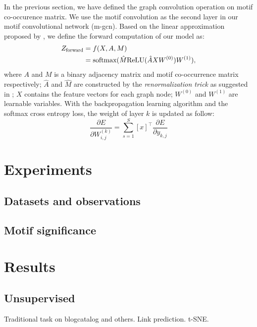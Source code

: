 \documentclass{article}
\theoremstyle{definition}
\begin{document}
In the previous section, we have defined the graph convolution
operation on motif co-occurence matrix. We use the motif convolution
as the second layer in our motif convolutional network (m-gcn). Based on the 
linear approximation proposed by \citeauthor{gcn}, we define the forward
computation of our model as:
\begin{equation} \label{eq:2}
    \begin{aligned}
    Z_{\scalebox{0.75}{forward}} &= f(X,A,M) \\
    &= \mbox{softmax}(\hat{M} \mbox{ReLU}(\hat{A}XW^{(0)})W^{(1)}),
    \end{aligned}
\end{equation}
where $A$ and $M$ is a binary adjacency matrix and motif co-occurrence
matrix respectively; $\hat{A}$ and $\hat{M}$ are constructed by the
\emph{renormalization trick} as suggested in \cite{gcn}; $X$ contains
the feature vectors for each graph node; $W^{(0)}$ and $W^{(1)}$ are
learnable variables. With the backpropagation learning algorithm and the
softmax cross entropy loss, the weight of layer $k$ is updated as follow: 
\begin{equation}
\label{eq:3}
\frac{\partial E}{\partial W^{(k)}_{i,j}} = \sum^S_{s=1} [x]^\top \frac{\partial E}{\partial y_{k,j}}
\end{equation}

\section{Experiments}



\subsection{Datasets and observations}

\subsection{Motif significance}

\section{Results}

\subsection{Unsupervised}

Traditional task on blogcatalog and others.
Link prediction.
t-SNE.
\end{document}
